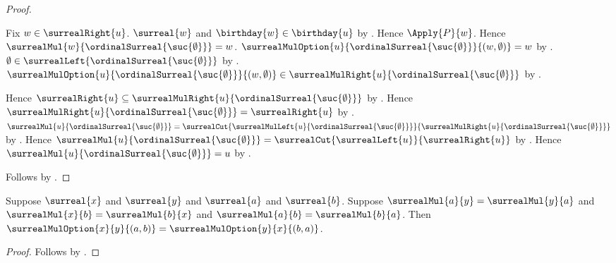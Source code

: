 \begin{proof}
\begin{subproof}
        \begin{subproof}
            Fix $w\in\surrealRight{u}$.
            $\surreal{w}$ and $\birthday{w}\in\birthday{u}$
                by .
            Hence $\Apply{P}{w}$.
            Hence
                $\surrealMul{w}{\ordinalSurreal{\suc{\emptyset}}}=w$.
            $\surrealMulOption{u}{\ordinalSurreal{\suc{\emptyset}}}
                    {(w,\emptyset)}
                =w$
                by .
            $\emptyset\in
                \surrealLeft{\ordinalSurreal{\suc{\emptyset}}}$
                by .
            $\surrealMulOption{u}{\ordinalSurreal{\suc{\emptyset}}}
                    {(w,\emptyset)}
                \in\surrealMulRight{u}
                    {\ordinalSurreal{\suc{\emptyset}}}$
                by .
        \end{subproof}
        Hence
            $\surrealRight{u}\subseteq
                \surrealMulRight{u}{\ordinalSurreal{\suc{\emptyset}}}$
            by .
        Hence
            $\surrealMulRight{u}{\ordinalSurreal{\suc{\emptyset}}}
                =\surrealRight{u}$
            by .
        $\surrealMul{u}{\ordinalSurreal{\suc{\emptyset}}}
            =\surrealCut
                {\surrealMulLeft{u}{\ordinalSurreal{\suc{\emptyset}}}}
                {\surrealMulRight{u}{\ordinalSurreal{\suc{\emptyset}}}}$
            by .
        Hence
            $\surrealMul{u}{\ordinalSurreal{\suc{\emptyset}}}
                =\surrealCut{\surrealLeft{u}}{\surrealRight{u}}$
            by \auto.
        Hence
            $\surrealMul{u}{\ordinalSurreal{\suc{\emptyset}}}=u$
            by .
    \end{subproof}
    Follows by .
\end{proof}

\begin{lemma}\label{surreal_mul_option_swap_from_equalities}
    Suppose $\surreal{x}$ and $\surreal{y}$ and
        $\surreal{a}$ and $\surreal{b}$.
    Suppose $\surrealMul{a}{y}=\surrealMul{y}{a}$ and
        $\surrealMul{x}{b}=\surrealMul{b}{x}$ and
        $\surrealMul{a}{b}=\surrealMul{b}{a}$.
    Then
        $\surrealMulOption{x}{y}{(a,b)}
            =\surrealMulOption{y}{x}{(b,a)}$.
\end{lemma}
\begin{proof}
    Follows by
        .
\end{proof}

